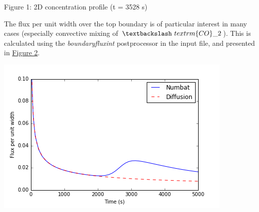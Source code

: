 \documentclass[12pt]{article}
\begin{document}
\par
Figure 1: 2D concentration profile (t = 3528 s)
\par
The flux per unit width over the top boundary is of particular interest in many cases
(especially convective mixing of $\textbackslash~textrm\{CO\}\_2$). This is calculated using the \emph{boundaryfluxint} postprocessor in the input file, and presented in \href{#Figure}{Figure 2}.
\par
\includegraphics[width=\linewidth]{media/2Dflux.png}
\end{document}
